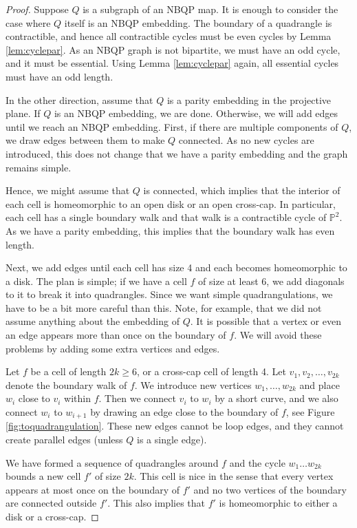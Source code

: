 \documentclass{article}
\newcommand{\Pb}[0]{\mathbb{P}}
\begin{document}
\begin{proof}
    Suppose $Q$ is a subgraph of an NBQP map. It is enough to consider the case where $Q$ itself is an NBQP embedding. The boundary of a quadrangle is contractible, and hence all contractible cycles must be even cycles by Lemma \ref{lem:cyclepar}. As an NBQP graph is not bipartite, we must have an odd cycle, and it must be essential. Using Lemma \ref{lem:cyclepar} again, all essential cycles must have an odd length.   

    In the other direction, assume that $Q$ is a parity embedding in the projective plane. If $Q$ is an NBQP embedding, we are done. Otherwise, we will add edges until we reach an NBQP embedding. First, if there are multiple components of $Q$, we draw edges between them to make  $Q$ connected. As no new cycles are introduced, this does not change that we have a parity embedding and the graph remains simple. 

    Hence, we might assume that $Q$ is connected, which implies that the interior of each cell is homeomorphic to an open disk or an open cross-cap.  In particular, each cell has a single boundary walk and that walk is a contractible cycle of $\Pb^2$. As we have a parity embedding, this implies that the boundary walk has even length. 

    Next, we add edges until each cell has size 4 and each becomes homeomorphic to a disk. The plan is simple; if we have a cell $f$ of size at least 6, we add diagonals to it to break it into quadrangles. Since we want simple quadrangulations, we have to be a bit more careful than this. Note, for example, that we did not assume anything about the embedding of $Q$. It is possible that a vertex or even an edge appears more than once on the boundary of $f$. We will avoid these problems by adding some extra vertices and edges. 
    
    Let $f$ be a cell of length $2k\ge 6$, or a cross-cap cell of length 4. Let $v_1,v_2,\dots, v_{2k}$ denote the boundary walk of $f$. We introduce new vertices $w_1,\dots, w_{2k}$ and place $w_i$ close to $v_i$ within $f$. Then we connect $v_i$ to $w_i$ by a short curve, and we also connect $w_i$ to $w_{i+1}$ by drawing an edge close to the boundary of $f$, see Figure \ref{fig:toquadrangulation}. These new edges cannot be loop edges, and they cannot create parallel edges (unless $Q$ is a single edge). 

    We have formed a sequence of quadrangles around $f$ and the cycle $w_1\dots w_{2k}$ bounds a new cell $f'$ of size $2k$. This cell is nice in the sense that every vertex appears at most once on the boundary of $f'$ and no two vertices of the boundary are connected outside $f'$. This also implies that $f'$ is homeomorphic to either a disk or a cross-cap. 


\end{proof}
\end{document}
